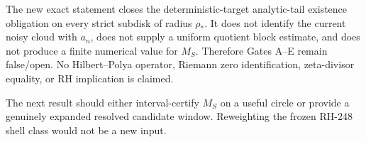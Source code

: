 \documentclass[11pt]{article}
\theoremstyle{definition}
\theoremstyle{remark}
\begin{document}
The new exact statement closes the deterministic-target analytic-tail
existence obligation on every strict subdisk of radius $\rho_*$.  It does not
identify the current noisy cloud with $a_n$, does not supply a uniform quotient
block estimate, and does not produce a finite numerical value for $M_S$.
Therefore Gates A--E remain false/open.  No Hilbert--Polya operator, Riemann
zero identification, zeta-divisor equality, or RH implication is claimed.

The next result should either interval-certify $M_S$ on a useful circle or
provide a genuinely expanded resolved candidate window.  Reweighting the
frozen RH-248 shell class would not be a new input.



\end{document}
